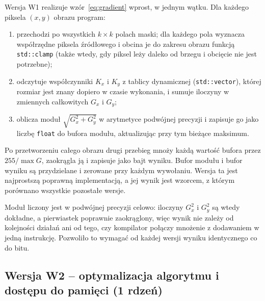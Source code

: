 \documentclass[12pt,a4paper]{article}
\newcommand{\kod}[1]{\texttt{#1}}
\begin{document}
Wersja W1 realizuje wzór~\eqref{eq:gradient} wprost, w jednym wątku. Dla każdego piksela $(x, y)$ obrazu program:
\begin{enumerate}
	\item przechodzi po wszystkich $k \times k$ polach maski; dla każdego pola wyznacza współrzędne piksela źródłowego i obcina je do zakresu obrazu funkcją \kod{std::clamp} (także wtedy, gdy piksel leży daleko od brzegu i obcięcie nie jest potrzebne);
	\item odczytuje współczynniki $K_x$ i $K_y$ z tablicy dynamicznej (\kod{std::vector}), której rozmiar jest znany dopiero w czasie wykonania, i sumuje iloczyny w zmiennych całkowitych $G_x$ i $G_y$;
	\item oblicza moduł $\sqrt{G_x^2 + G_y^2}$ w arytmetyce podwójnej precyzji i zapisuje go jako liczbę \kod{float} do bufora modułu, aktualizując przy tym bieżące maksimum.
\end{enumerate}
Po przetworzeniu całego obrazu drugi przebieg mnoży każdą wartość bufora przez $255/\max G$, zaokrągla ją i zapisuje jako bajt wyniku. Bufor modułu i bufor wyniku są przydzielane i zerowane przy każdym wywołaniu. Wersja ta jest najprostszą poprawną implementacją, a jej wynik jest wzorcem, z którym porównano wszystkie pozostałe wersje.

Moduł liczony jest w podwójnej precyzji celowo: iloczyny $G_x^2$ i $G_y^2$ są wtedy dokładne, a pierwiastek poprawnie zaokrąglony, więc wynik nie zależy od kolejności działań ani od tego, czy kompilator połączy mnożenie z dodawaniem w jedną instrukcję. Pozwoliło to wymagać od każdej wersji wyniku identycznego co do bitu.

\subsection{Wersja W2 -- optymalizacja algorytmu i dostępu do pamięci (1 rdzeń)}
\end{document}
